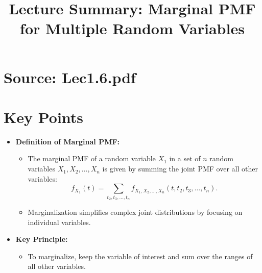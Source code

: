 \documentclass{article}
\title{Lecture Summary: Marginal PMF for Multiple Random Variables}
\author{}
\date{}
\begin{document}
\maketitle

\section*{Source: Lec1.6.pdf}

\section*{Key Points}

\begin{itemize}
  \item \textbf{Definition of Marginal PMF:}
    \begin{itemize}
      \item The marginal PMF of a random variable $X_1$ in a set of $n$ random variables $X_1, X_2, \dots, X_n$ is given by summing the joint PMF over all other variables:
        \[
          f_{X_1}(t) = \sum_{t_2, t_3, \dots, t_n} f_{X_1, X_2, \dots, X_n}(t, t_2, t_3, \dots, t_n).
        \]
      \item Marginalization simplifies complex joint distributions by focusing on individual variables.
    \end{itemize}

  \item \textbf{Key Principle:}
    \begin{itemize}
      \item To marginalize, keep the variable of interest and sum over the ranges of all other variables.
    \end{itemize}


\end{itemize}
\end{document}
